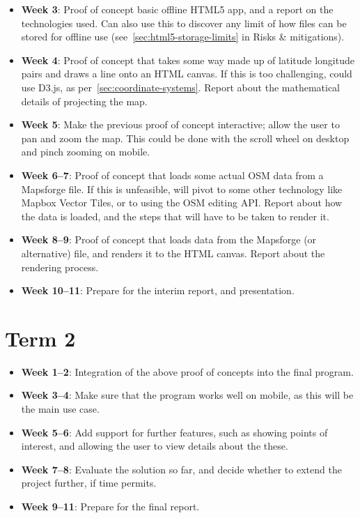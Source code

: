 \documentclass[]{final_report}
\begin{document}
\begin{itemize}
    \item \textbf{Week 3}: Proof of concept basic offline HTML5 app, and a report on the technologies used. Can also use this to discover any limit of how files can be stored for offline use (see~\ref{sec:html5-storage-limits} in Risks \& mitigations).
    \item \textbf{Week 4}: Proof of concept that takes some way made up of latitude longitude pairs and draws a line onto an HTML canvas. If this is too challenging, could use D3.js, as per~\ref{sec:coordinate-systems}. Report about the mathematical details of projecting the map.
    \item \textbf{Week 5}: Make the previous proof of concept interactive; allow the user to pan and zoom the map. This could be done with the scroll wheel on desktop and pinch zooming on mobile.
    \item \textbf{Week 6--7}: Proof of concept that loads some actual OSM data from a Mapsforge file. If this is unfeasible, will pivot to some other technology like Mapbox Vector Tiles, or to using the OSM editing API\@. Report about how the data is loaded, and the steps that will have to be taken to render it.
    \item \textbf{Week 8--9}: Proof of concept that loads data from the Mapsforge (or alternative) file, and renders it to the HTML canvas. Report about the rendering process.
    \item \textbf{Week 10--11}: Prepare for the interim report, and presentation.
\end{itemize}

\section{Term 2}

\begin{itemize}
    \item \textbf{Week 1--2}: Integration of the above proof of concepts into the final program.
    \item \textbf{Week 3--4}: Make sure that the program works well on mobile, as this will be the main use case.
    \item \textbf{Week 5--6}: Add support for further features, such as showing points of interest, and allowing the user to view details about the these.
    \item \textbf{Week 7--8}: Evaluate the solution so far, and decide whether to extend the project further, if time permits.
    \item \textbf{Week 9--11}: Prepare for the final report.
\end{itemize}
\end{document}
